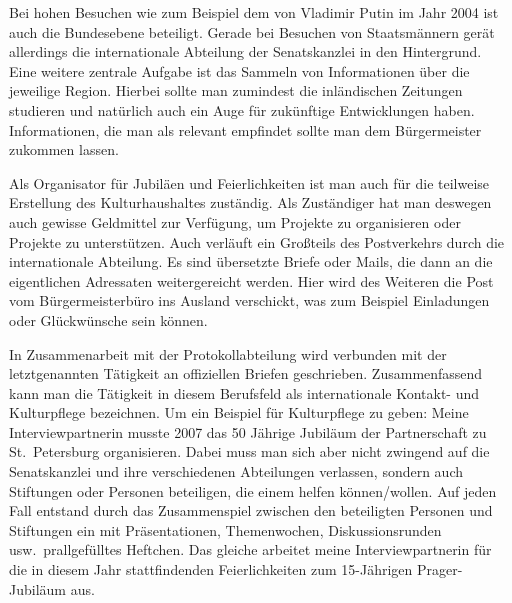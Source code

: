 \documentclass[12pt,headsepline,a4paper]{scrartcl}
\begin{document}
Bei hohen Besuchen wie zum Beispiel dem von Vladimir Putin im Jahr 2004 ist auch die Bundesebene beteiligt. Gerade bei Besuchen von Staatsmännern gerät allerdings  die internationale  Abteilung der Senatskanzlei in den Hintergrund.
Eine weitere zentrale Aufgabe ist das Sammeln von Informationen über die jeweilige Region. Hierbei sollte man zumindest die inländischen Zeitungen studieren und natürlich auch ein Auge für zukünftige Entwicklungen haben. Informationen, die man als relevant empfindet sollte man dem Bürgermeister zukommen lassen.

Als Organisator für Jubiläen und Feierlichkeiten ist man auch für die teilweise Erstellung des Kulturhaushaltes zuständig. Als Zuständiger hat man deswegen auch gewisse Geldmittel zur Verfügung, um Projekte zu organisieren oder Projekte zu unterstützen.
Auch verläuft ein Großteils des Postverkehrs durch die internationale Abteilung. Es sind übersetzte Briefe oder Mails, die dann an die eigentlichen Adressaten weitergereicht werden. Hier wird des Weiteren die Post vom Bürgermeisterbüro ins Ausland verschickt, was zum Beispiel Einladungen oder Glückwünsche sein können.

In Zusammenarbeit mit der Protokollabteilung wird verbunden mit der letztgenannten Tätigkeit an offiziellen Briefen geschrieben.
Zusammenfassend kann man die Tätigkeit in diesem Berufsfeld als internationale Kontakt- und Kulturpflege bezeichnen.
Um ein Beispiel für Kulturpflege zu geben: Meine Interviewpartnerin musste  2007 das 50 Jährige Jubiläum der Partnerschaft zu St.\ Petersburg organisieren. Dabei muss man sich aber nicht zwingend auf die Senatskanzlei und ihre verschiedenen Abteilungen verlassen, sondern auch Stiftungen oder Personen beteiligen, die einem helfen können/wollen. Auf jeden Fall entstand durch das Zusammenspiel zwischen den beteiligten Personen und Stiftungen ein mit Präsentationen, Themenwochen, Diskussionsrunden usw.\  prallgefülltes Heftchen.
Das gleiche arbeitet meine Interviewpartnerin für die in diesem Jahr stattfindenden Feierlichkeiten zum 15-Jährigen Prager-Jubiläum aus.
\end{document}
